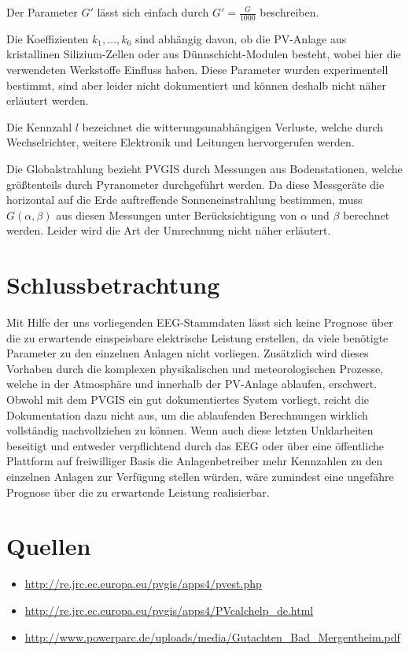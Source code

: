 \documentclass[a4paper,11pt]{article}
\begin{document}
Der Parameter $G'$ lässt sich einfach durch $G'=\frac{G}{1000}$ beschreiben.

Die Koeffizienten $k_1,\dots,k_6$ sind abhängig davon, ob die PV-Anlage aus
kristallinen Silizium-Zellen oder aus Dünnschicht-Modulen besteht, wobei hier
die verwendeten Werkstoffe Einfluss haben. Diese Parameter wurden
experimentell bestimmt, sind aber leider nicht dokumentiert und können deshalb
nicht näher erläutert werden.

Die Kennzahl $l$ bezeichnet die witterungsunabhängigen Verluste, welche durch
Wechselrichter, weitere Elektronik und Leitungen hervorgerufen werden.

Die Globalstrahlung bezieht PVGIS durch Messungen aus Bodenstationen, welche
größtenteils durch Pyranometer durchgeführt werden. Da diese Messgeräte die
horizontal auf die Erde auftreffende Sonneneinstrahlung bestimmen, muss
$G(\alpha,\beta)$ aus diesen Messungen unter Berücksichtigung von $\alpha$ und
$\beta$ berechnet werden. Leider wird die Art der Umrechnung nicht näher
erläutert.

\section{Schlussbetrachtung}

Mit Hilfe der uns vorliegenden EEG-Stammdaten lässt sich keine Prognose über
die zu erwartende einspeisbare elektrische Leistung erstellen, da viele
benötigte Parameter zu den einzelnen Anlagen nicht vorliegen. Zusätzlich wird
dieses Vorhaben durch die komplexen physikalischen und meteorologischen
Prozesse, welche in der Atmosphäre und innerhalb der PV-Anlage ablaufen,
erschwert. Obwohl mit dem  PVGIS ein gut dokumentiertes System vorliegt,
reicht die Dokumentation dazu nicht aus, um die ablaufenden Berechnungen
wirklich vollständig nachvollziehen zu können. Wenn auch diese letzten
Unklarheiten beseitigt und entweder verpflichtend durch das EEG oder über eine
öffentliche Plattform auf freiwilliger Basis die Anlagenbetreiber mehr
Kennzahlen zu den einzelnen Anlagen zur Verfügung stellen würden, wäre
zumindest eine ungefähre Prognose über die zu erwartende Leistung
realisierbar.

\section{Quellen}
\begin{itemize}
\item \url{http://re.jrc.ec.europa.eu/pvgis/apps4/pvest.php}
\item \url{http://re.jrc.ec.europa.eu/pvgis/apps4/PVcalchelp_de.html}
\item
  \url{http://www.powerparc.de/uploads/media/Gutachten_Bad_Mergentheim.pdf} 
\end{itemize}
\end{document}
